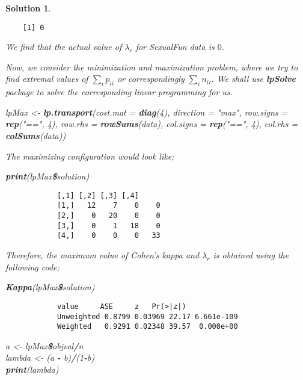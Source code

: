 \documentclass[12pt]{article}
\newenvironment{Shaded}{\begin{snugshade}}{\end{snugshade}}
\newcommand{\KeywordTok}[1]{\textcolor[rgb]{0.13,0.29,0.53}{\textbf{#1}}}
\newcommand{\DataTypeTok}[1]{\textcolor[rgb]{0.13,0.29,0.53}{#1}}
\newcommand{\DecValTok}[1]{\textcolor[rgb]{0.00,0.00,0.81}{#1}}
\newcommand{\StringTok}[1]{\textcolor[rgb]{0.31,0.60,0.02}{#1}}
\newcommand{\OperatorTok}[1]{\textcolor[rgb]{0.81,0.36,0.00}{\textbf{#1}}}
\newcommand{\NormalTok}[1]{#1}
\theoremstyle{problemstyle}
\newtheorem*{solution*}{Solution}
\begin{document}
\begin{solution*}
\begin{enumerate}
	\begin{verbatim}
	[1] 0
	\end{verbatim}
	
	We find that the actual value of \(\lambda_r\) for \emph{SexualFun} data
	is \(0\).
	
	Now, we consider the minimization and maximization problem, where we try
	to find extremal values of \(\sum_i p_{ii}\) or correspondingly
	\(\sum_i n_{ii}\). We shall use \textbf{lpSolve} package to solve the
	corresponding linear programming for us.
	
	\begin{Shaded}
			\NormalTok{lpMax \textless- }\StringTok{ }\KeywordTok{lp.transport}\NormalTok{(}\DataTypeTok{cost.mat =} \KeywordTok{diag}\NormalTok{(}\DecValTok{4}\NormalTok{), }\DataTypeTok{direction =} \StringTok{"max"}\NormalTok{, }
			\DataTypeTok{row.signs =} \KeywordTok{rep}\NormalTok{(}\StringTok{"=="}\NormalTok{, }\DecValTok{4}\NormalTok{), }\DataTypeTok{row.rhs =} \KeywordTok{rowSums}\NormalTok{(data), }
			\DataTypeTok{col.signs =} \KeywordTok{rep}\NormalTok{(}\StringTok{"=="}\NormalTok{, }\DecValTok{4}\NormalTok{), }\DataTypeTok{col.rhs =} \KeywordTok{colSums}\NormalTok{(data))}
	\end{Shaded}
	
	The maximizing configuration would look like;
	
	\begin{Shaded}
			\KeywordTok{print}\NormalTok{(lpMax}\OperatorTok{\$}\NormalTok{solution)}
	\end{Shaded}
			
	\begin{verbatim}
			[,1] [,2] [,3] [,4]
			[1,]   12    7    0    0
			[2,]    0   20    0    0
			[3,]    0    1   18    0
			[4,]    0    0    0   33
	\end{verbatim}
			
	Therefore, the maximum value of Cohen's kappa and \(\lambda_r\) is
	obtained using the following code;
	
	\begin{Shaded}
			\KeywordTok{Kappa}\NormalTok{(lpMax}\OperatorTok{\$}\NormalTok{solution)}
	\end{Shaded}
			
	\begin{verbatim}
			value     ASE     z   Pr(>|z|)
			Unweighted 0.8799 0.03969 22.17 6.661e-109
			Weighted   0.9291 0.02348 39.57  0.000e+00
	\end{verbatim}
			
	\begin{Shaded}
			\NormalTok{a \textless- }\StringTok{ }\NormalTok{lpMax}\OperatorTok{\$}\NormalTok{objval}\OperatorTok{/}\NormalTok{n}\\
			\NormalTok{lambda \textless- }\StringTok{ }\NormalTok{(a }\OperatorTok{-}\StringTok{ }\NormalTok{b)}\OperatorTok{/}\NormalTok{(}\DecValTok{1}\OperatorTok{-}\NormalTok{b)}\\
			\KeywordTok{print}\NormalTok{(lambda)}
	\end{Shaded}
	

\end{enumerate}
\end{solution*}
\end{document}
